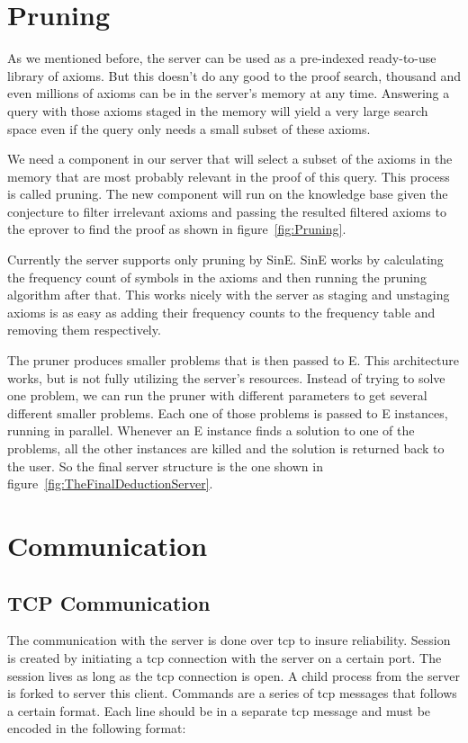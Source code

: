\section{Pruning}
As we mentioned before, the server can be used as a pre-indexed ready-to-use library of axioms. But this doesn't do any good to the proof search, thousand and even millions of axioms can be in the server's memory at any time. Answering a query with those axioms staged in the memory will yield a very large search space even if the query only needs a small subset of these axioms.

We need a component in our server that will select a subset of the axioms in the memory that are most probably relevant in the proof of this query. This process is called pruning. The new component will run on the knowledge base given the conjecture to filter irrelevant axioms and passing the resulted filtered axioms to the eprover to find the proof as shown in figure~\ref{fig:Pruning}.


Currently the server supports only pruning by SinE. SinE works by calculating the frequency count of symbols in the axioms and then running the pruning algorithm after that. This works nicely with the server as staging and unstaging axioms is as easy as adding their frequency counts to the frequency table and removing them respectively.

The pruner produces smaller problems that is then passed to E. This architecture works, but is not fully utilizing the server's resources. Instead of trying to solve one problem, we can run the pruner with different parameters to get several different smaller problems. Each one of those problems is passed to E instances, running in parallel. Whenever an E instance finds a solution to one of the problems, all the other instances are killed and the solution is returned back to the user. So the final server structure is the one shown in figure~\ref{fig:TheFinalDeductionServer}.


\section{Communication}
\subsection{TCP Communication}\label{subsec:tcpCommunication}
The communication with the server is done over \ac{tcp} to insure reliability. Session is created by initiating a \ac{tcp} connection with the server on a certain port. The session lives as long as the \ac{tcp} connection is open. A child process from the server is forked to server this client. Commands are a series of \ac{tcp} messages that follows a certain format. Each line should be in a separate \ac{tcp} message and must be encoded in the following format:

